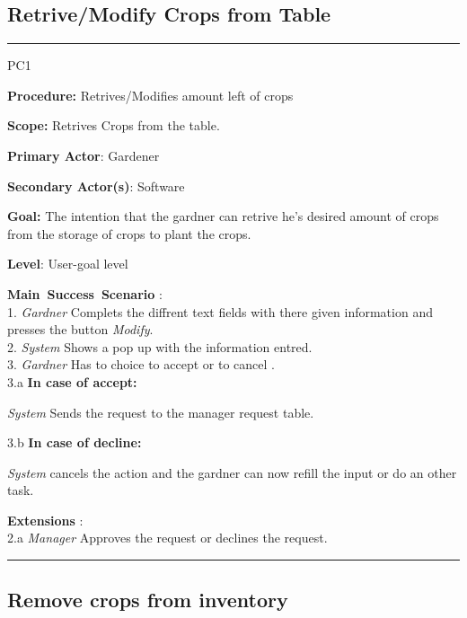 \subsection{Retrive/Modify Crops from Table}

\vspace{0.5cm}
\hrule
\hfill \break
\begin{lyxlist}{PC1}
\small{
\item [\textbf{Procedure:}] Retrives/Modifies amount left of crops
\item [\textbf{Scope:}] Retrives Crops from the table.
\item [\textbf{Primary Actor}:] Gardener
\item [\textbf{Secondary Actor(s)}:] Software
\item [\textbf{Goal:}] The intention that the gardner can retrive he's desired
amount of crops from the storage of crops to plant the crops.
\item [\textbf{Level}:] User-goal level
\item [\textbf{Main~Success~Scenario}]:\\
1. \emph{Gardner} Complets the diffrent text fields with there given
information and presses the button \emph{Modify}. \\
2. \emph{System} Shows a pop up with the information entred.\\
3. \emph{Gardner} Has to choice to accept or to cancel .\\
	3.a \textbf{In case of accept:}
		\begin{Tab}{2em} \emph{System} Sends the request to the manager
		request table.\end{Tab}
	3.b \textbf{In case of decline:}
		\begin{Tab}{2em} \emph{System} cancels the action and the gardner can
		now refill the input or do an other task. \end{Tab}
\item [\textbf{Extensions}]:\\
2.a  \emph{Manager} Approves the request or declines the request.\\
}
\end{lyxlist}
\hrule
\vspace{0.5cm}

\break





\subsection{Remove crops from inventory}

